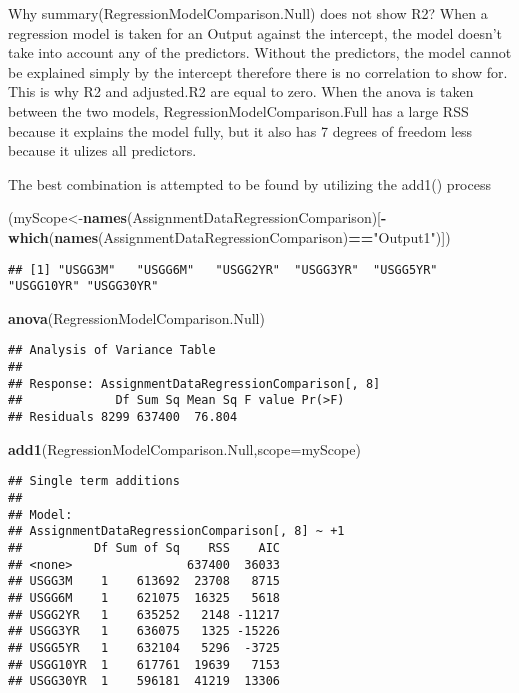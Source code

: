 \documentclass[]{article}
\newenvironment{Shaded}{\begin{snugshade}}{\end{snugshade}}
\newcommand{\KeywordTok}[1]{\textcolor[rgb]{0.13,0.29,0.53}{\textbf{#1}}}
\newcommand{\DataTypeTok}[1]{\textcolor[rgb]{0.13,0.29,0.53}{#1}}
\newcommand{\StringTok}[1]{\textcolor[rgb]{0.31,0.60,0.02}{#1}}
\newcommand{\OperatorTok}[1]{\textcolor[rgb]{0.81,0.36,0.00}{\textbf{#1}}}
\newcommand{\NormalTok}[1]{#1}
\begin{document}
Why summary(RegressionModelComparison.Null) does not show R2? When a
regression model is taken for an Output against the intercept, the model
doesn't take into account any of the predictors. Without the predictors,
the model cannot be explained simply by the intercept therefore there is
no correlation to show for. This is why R2 and adjusted.R2 are equal to
zero. When the anova is taken between the two models,
RegressionModelComparison.Full has a large RSS because it explains the
model fully, but it also has 7 degrees of freedom less because it ulizes
all predictors.

The best combination is attempted to be found by utilizing the add1()
process

\begin{Shaded}
\begin{Highlighting}[]
\NormalTok{(myScope<-}\KeywordTok{names}\NormalTok{(AssignmentDataRegressionComparison)[}\OperatorTok{-}\KeywordTok{which}\NormalTok{(}\KeywordTok{names}\NormalTok{(AssignmentDataRegressionComparison)}\OperatorTok{==}\StringTok{"Output1"}\NormalTok{)])}
\end{Highlighting}
\end{Shaded}

\begin{verbatim}
## [1] "USGG3M"   "USGG6M"   "USGG2YR"  "USGG3YR"  "USGG5YR"  "USGG10YR" "USGG30YR"
\end{verbatim}

\begin{Shaded}
\begin{Highlighting}[]
\KeywordTok{anova}\NormalTok{(RegressionModelComparison.Null)}
\end{Highlighting}
\end{Shaded}

\begin{verbatim}
## Analysis of Variance Table
## 
## Response: AssignmentDataRegressionComparison[, 8]
##             Df Sum Sq Mean Sq F value Pr(>F)
## Residuals 8299 637400  76.804
\end{verbatim}

\begin{Shaded}
\begin{Highlighting}[]
\KeywordTok{add1}\NormalTok{(RegressionModelComparison.Null,}\DataTypeTok{scope=}\NormalTok{myScope)}
\end{Highlighting}
\end{Shaded}

\begin{verbatim}
## Single term additions
## 
## Model:
## AssignmentDataRegressionComparison[, 8] ~ +1
##          Df Sum of Sq    RSS    AIC
## <none>                637400  36033
## USGG3M    1    613692  23708   8715
## USGG6M    1    621075  16325   5618
## USGG2YR   1    635252   2148 -11217
## USGG3YR   1    636075   1325 -15226
## USGG5YR   1    632104   5296  -3725
## USGG10YR  1    617761  19639   7153
## USGG30YR  1    596181  41219  13306
\end{verbatim}
\end{document}
